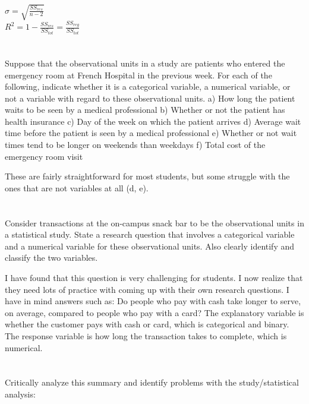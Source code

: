 \documentclass[11pt]{article}
\begin{document}
$\hat{\sigma} = \sqrt{\frac{SS_{res}}{n-2}}$ \\
$R^2 = 1-\frac{SS_{res}}{SS_{tot}} = \frac{SS_{reg}}{SS_{tot}}$ 


\begin{center}
\underline{\hspace{4in}} 
\end{center}

\section{} Suppose that the observational units in a study are patients who entered the emergency room at French Hospital in the previous week.  For each of the following, indicate whether it is a categorical variable, a numerical variable, or not a variable with regard to these observational units. a) How long the patient waits to be seen by a medical professional b) Whether or not the patient has health insurance c) Day of the week on which the patient arrives d) Average wait time before the patient is seen by a medical professional e) Whether or not wait times tend to be longer on weekends than weekdays f) Total cost of the emergency room visit

These are fairly straightforward for most students, but some struggle with the ones that are not variables at all (d, e).


\section{} Consider transactions at the on-campus snack bar to be the observational units in a statistical study.  State a research question that involves a categorical variable and a numerical variable for these observational units.  Also clearly identify and classify the two variables.

I have found that this question is very challenging for students.  I now realize that they need lots of practice with coming up with their own research questions.  I have in mind answers such as: Do people who pay with cash take longer to serve, on average, compared to people who pay with a card?  The explanatory variable is whether the customer pays with cash or card, which is categorical and binary. The response variable is how long the transaction takes to complete, which is numerical.


\section{} Critically analyze this summary and identify problems with the study/statistical analysis:
\end{document}
